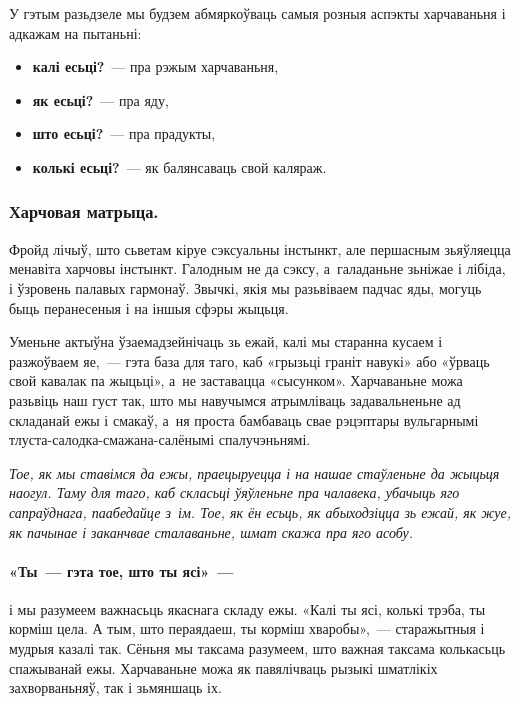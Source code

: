 У гэтым разьдзеле мы будзем абмяркоўваць самыя розныя аспэкты харчаваньня і адкажам на пытаньні: 

\begin{itemize}
  \item \textbf{калі есьці?}~--- пра рэжым харчаваньня,
  \item \textbf{як есьці?}~--- пра яду,
  \item \textbf{што есьці?}~--- пра прадукты,
  \item \textbf{колькі есьці?}~--- як балянсаваць свой каляраж.
\end{itemize}

\subsubsection{Харчовая матрыца.}
Фройд лічыў, што сьветам кіруе сэксуальны інстынкт, але першасным зьяўляецца менавіта харчовы інстынкт. Галодным не да сэксу, а~галаданьне зьніжае і лібіда, і ўзровень палавых гармонаў. Звычкі, якія мы разьвіваем падчас яды, могуць быць перанесеныя і на іншыя сфэры жыцьця. 


Уменьне актыўна ўзаемадзейнічаць зь ежай, калі мы старанна кусаем і разжоўваем яе,~--- гэта база для таго, каб «грызьці граніт навукі» або «ўрваць свой кавалак па жыцьці», а~не заставацца «сысунком». Харчаваньне можа разьвіць наш густ так, што мы навучымся атрымліваць задавальненьне ад складанай ежы і смакаў, а~ня проста бамбаваць свае рэцэптары вульгарнымі тлуста-салодка-смажана-салёнымі спалучэньнямі.

\emph{Тое, як мы ставімся да ежы, праецыруецца і на нашае стаўленьне да жыцьця наогул. Таму для таго, каб скласьці ўяўленьне пра чалавека, убачыць яго сапраўднага, паабедайце з~ім. Тое, як ён есьць, як абыходзіцца зь ежай, як жуе, як пачынае і заканчвае сталаваньне, шмат скажа пра яго асобу.}

\paragraph{«Ты~--- гэта тое, што ты ясі»~---} і мы разумеем важнасьць якаснага складу ежы. «Калі ты ясі, колькі трэба, ты корміш цела. А тым, што пераядаеш, ты корміш хваробы»,~--- старажытныя і мудрыя казалі так. Сёньня мы таксама разумеем, што важная таксама колькасьць спажыванай ежы. Харчаваньне можа як павялічваць рызыкі шматлікіх захворваньняў, так і зьмяншаць іх.

